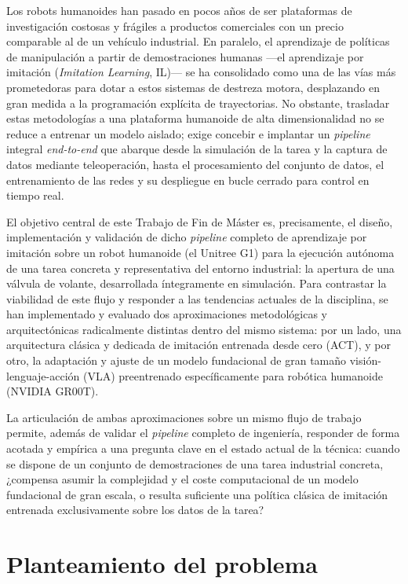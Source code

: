 \label{Introducción}

Los robots humanoides han pasado en pocos años de ser plataformas de investigación costosas y
frágiles a productos comerciales con un precio comparable al de un vehículo industrial. En paralelo,
el aprendizaje de políticas de manipulación a partir de demostraciones humanas —el aprendizaje por
imitación (\textit{Imitation Learning}, IL)— se ha consolidado como una de las vías más prometedoras
para dotar a estos sistemas de destreza motora, desplazando en gran medida a la programación explícita
de trayectorias. No obstante, trasladar estas metodologías a una plataforma humanoide de alta
dimensionalidad no se reduce a entrenar un modelo aislado; exige concebir e implantar un \textit{pipeline}
integral \textit{end-to-end} que abarque desde la simulación de la tarea y la captura de datos mediante
teleoperación, hasta el procesamiento del conjunto de datos, el entrenamiento de las redes y su despliegue
en bucle cerrado para control en tiempo real.

El objetivo central de este Trabajo de Fin de Máster es, precisamente, el diseño, implementación y
validación de dicho \textit{pipeline} completo de aprendizaje por imitación sobre un robot humanoide
(el Unitree G1) para la ejecución autónoma de una tarea concreta y representativa del entorno industrial:
la apertura de una válvula de volante, desarrollada íntegramente en simulación. Para contrastar la viabilidad
de este flujo y responder a las tendencias actuales de la disciplina, se han implementado y evaluado
dos aproximaciones metodológicas y arquitectónicas radicalmente distintas dentro del mismo sistema:
por un lado, una arquitectura clásica y dedicada de imitación entrenada desde cero (ACT), y por otro,
la adaptación y ajuste de un modelo fundacional de gran tamaño visión-lenguaje-acción (VLA) preentrenado
específicamente para robótica humanoide (NVIDIA GR00T).

La articulación de ambas aproximaciones sobre un mismo flujo de trabajo permite, además de validar el
\textit{pipeline} completo de ingeniería, responder de forma acotada y empírica a una pregunta clave en el estado
actual de la técnica: cuando se dispone de un conjunto de demostraciones de una tarea industrial concreta,
¿compensa asumir la complejidad y el coste computacional de un modelo fundacional de gran escala, o resulta
suficiente una política clásica de imitación entrenada exclusivamente sobre los datos de la tarea?


\section*{Planteamiento del problema}

